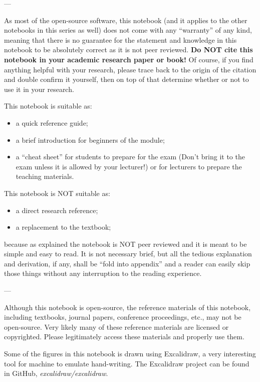 \noindent ---

\noindent As most of the open-source software, this notebook (and it applies to the other notebooks in this series as well) does not come with any ``warranty'' of any kind, meaning that there is no guarantee for the statement and knowledge in this notebook to be absolutely correct as it is not peer reviewed. \textbf{Do NOT cite this notebook in your academic research paper or book!} Of course, if you find anything helpful with your research, please trace back to the origin of the citation and double confirm it yourself, then on top of that determine whether or not to use it in your research.

This notebook is suitable as:
\begin{itemize}
  \item a quick reference guide;
  \item a brief introduction for beginners of the module;
  \item a ``cheat sheet'' for students to prepare for the exam (Don't bring it to the exam unless it is allowed by your lecturer!) or for lecturers to prepare the teaching materials.
\end{itemize}

This notebook is NOT suitable as:
\begin{itemize}
  \item a direct research reference;
  \item a replacement to the textbook;
\end{itemize}
because as explained the notebook is NOT peer reviewed and it is meant to be simple and easy to read. It is not necessary brief, but all the tedious explanation and derivation, if any, shall be ``fold into appendix'' and a reader can easily skip those things without any interruption to the reading experience.

\noindent ---

Although this notebook is open-source, the reference materials of this notebook, including textbooks, journal papers, conference proceedings, etc., may not be open-source. Very likely many of these reference materials are licensed or copyrighted. Please legitimately access these materials and properly use them.

Some of the figures in this notebook is drawn using Excalidraw, a very interesting tool for machine to emulate hand-writing. The Excalidraw project can be found in GitHub, \textit{excalidraw/excalidraw}.

